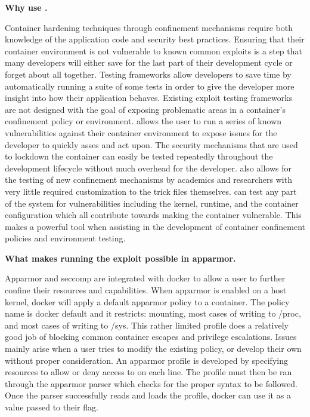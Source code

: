 \noindent\textbf{Why use \houdini.}

Container hardening techniques through confinement mechanisms require both knowledge of the application code and security best practices. Ensuring that their container environment is not vulnerable to known common exploits is a step that many developers will either save for the last part of their development cycle or forget about all together. Testing frameworks allow developers to save time by automatically running a suite of some tests in order to give the developer more insight into how their application behaves. Existing exploit testing frameworks are not designed with the goal of exposing problematic areas in a container's confinement policy or environment. \houdini allows the user to run a series of known vulnerabilities against their container environment to expose issues for the developer to quickly asses and act upon. The security mechanisms that are used to lockdown the container can easily be tested repeatedly throughout the development lifecycle without much overhead for the developer. \houdini also allows for the testing of new confinement mechanisms by academics and researchers with very little required customization to the trick files themselves. \houdini can test any part of the system for vulnerabilities including the kernel, runtime, and the container configuration which all contribute towards making the container vulnerable. This makes \houdini a powerful tool when assisting in the development of container confinement policies and environment testing.

\noindent\textbf{What makes running the exploit possible in apparmor.}

Apparmor and seccomp are integrated with docker to allow a user to further confine their resources and capabilities. When apparmor is enabled on a host kernel, docker will apply a default apparmor policy to a container. The policy name is docker default and it restricts: mounting, most cases of writing to /proc, and most cases of writing to /sys. This rather limited profile does a relatively good job of blocking common container escapes and privilege escalations. Issues mainly arise when a user tries to modify the existing policy, or develop their own without proper consideration. An apparmor profile is developed by specifying resources to allow or deny access to on each line. The profile must then be ran through the apparmor parser which checks for the proper syntax to be followed. Once the parser successfully reads and loads the profile, docker can use it as a value passed to their  flag.

